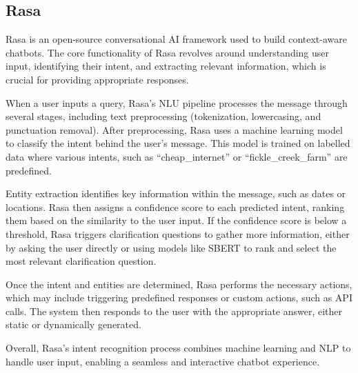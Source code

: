 \documentclass[11pt]{article}
\begin{document}
\subsection{Rasa}
Rasa is an open-source conversational AI framework used to build context-aware chatbots. The core functionality of Rasa revolves around understanding user input, identifying their intent, and extracting relevant information, which is crucial for providing appropriate responses. 

When a user inputs a query, Rasa's NLU pipeline processes the message through several stages, including text preprocessing (tokenization, lowercasing, and punctuation removal). After preprocessing, Rasa uses a machine learning model to classify the intent behind the user's message. This model is trained on labelled data where various intents, such as “cheap\_internet” or “fickle\_creek\_farm” are predefined.

Entity extraction identifies key information within the message, such as dates or locations. Rasa then assigns a confidence score to each predicted intent, ranking them based on the similarity to the user input. If the confidence score is below a threshold, Rasa triggers clarification questions to gather more information, either by asking the user directly or using models like SBERT to rank and select the most relevant clarification question.

Once the intent and entities are determined, Rasa performs the necessary actions, which may include triggering predefined responses or custom actions, such as API calls. The system then responds to the user with the appropriate answer, either static or dynamically generated.

Overall, Rasa's intent recognition process combines machine learning and NLP to handle user input, enabling a seamless and interactive chatbot experience.
\end{document}
